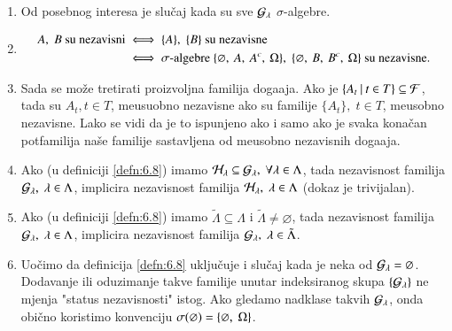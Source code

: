 \begin{nap} \label{nap:6.9}
    \quad
    \begin{enumerate}[label=(\alph*)]
        \item Od posebnog interesa je slu\v caj kada su sve $\mathcal{G}_{\lambda}$ $\sigma$-algebre.
        \item
        \begin{equation*}
            \begin{aligned}
                A, \; B \textnormal{ su nezavisni} &\iff \{A\}, \; \{B\} \textnormal{ su nezavisne}\\
                &\iff \sigma \textnormal{-algebre } \{ \varnothing, \: A, \: A^c, \: \Omega \}, \; \{ \varnothing, \: B, \: B^c, \: \Omega \} \textnormal{ su nezavisne}.
            \end{aligned}
        \end{equation*}
        \item   \label{nap:6.9c}
        Sada se mo\v ze tretirati proizvoljna familija doga\dj aja.
        Ako je $\{{A_t} \: | \: {t \in T}\} \subseteq \mathcal{F}$, tada su $A_t, t \in T$, me\dj usuobno nezavisne ako su familije $\{A_t\}, \; t \in T$, me\dj usobno nezavisne.
        Lako se vidi da je to ispunjeno ako i samo ako je svaka kona\v can potfamilija na\v se familije sastavljena od me\dj usobno nezavisnih doga\dj aja.
        \item \label{nap:6.9d}
        Ako (u definiciji \ref{defn:6.8}) imamo $\mathcal{H}_\lambda \subseteq \mathcal{G}_\lambda, \; \forall \lambda \in \Lambda$, tada nezavisnost familija $\mathcal{G}_\lambda, \; \lambda \in \Lambda$, implicira nezavisnost familija $\mathcal{H}_\lambda, \; \lambda \in \Lambda$ (dokaz je trivijalan).
        \item Ako (u definiciji \ref{defn:6.8}) imamo $\tilde{\Lambda} \subseteq \Lambda$ i $\tilde{\Lambda} \neq \varnothing$, tada nezavisnost familija $\mathcal{G}_\lambda, \; \lambda \in \Lambda$, implicira nezavisnost familija $\mathcal{G}_\lambda, \; \lambda \in \tilde{\Lambda}$.
        \item \label{nap:6.9f}
        Uo\v cimo da definicija \ref{defn:6.8} uklju\v cuje i slu\v caj kada je neka od $\mathcal{G}_\lambda = \varnothing$.
        Dodavanje ili oduzimanje takve familije unutar indeksiranog skupa $\{\mathcal{G}_\lambda\}$ ne mjenja "status nezavisnosti" istog.
        Ako gledamo nadklase takvih $\mathcal{G}_\lambda$, onda obi\v cno koristimo konvenciju $\sigma({\varnothing}) = \{ \varnothing, \; \Omega\}$.
    \end{enumerate}
\end{nap}

